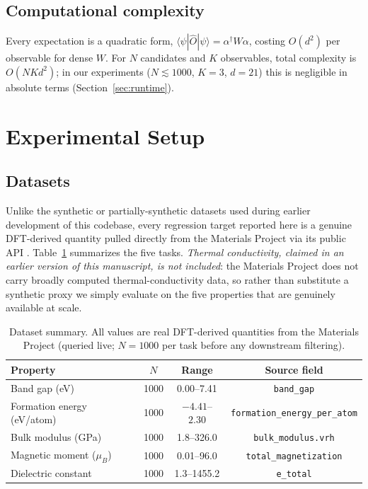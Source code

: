 \documentclass[conference]{IEEEtran}
\begin{document}
\subsection{Computational complexity}

Every expectation is a quadratic form, $\langle\psi|\hat{O}|\psi\rangle = \alpha^\dagger W \alpha$, costing $O(d^2)$ per observable for dense $W$. For $N$ candidates and $K$ observables, total complexity is $O(NKd^2)$; in our experiments ($N\lesssim 1000$, $K=3$, $d=21$) this is negligible in absolute terms (Section~\ref{sec:runtime}).

\section{Experimental Setup}\label{sec:setup}

\subsection{Datasets}

Unlike the synthetic or partially-synthetic datasets used during earlier development of this codebase, every regression target reported here is a genuine DFT-derived quantity pulled directly from the Materials Project via its public API \cite{jain2013materials}. Table~\ref{tab:dataset} summarizes the five tasks. \emph{Thermal conductivity, claimed in an earlier version of this manuscript, is not included}: the Materials Project does not carry broadly computed thermal-conductivity data, so rather than substitute a synthetic proxy we simply evaluate on the five properties that are genuinely available at scale.

\begin{table}[!t]
\centering
\caption{Dataset summary. All values are real DFT-derived quantities from the Materials Project (queried live; $N=1000$ per task before any downstream filtering).}
\label{tab:dataset}
\begin{tabular}{lccc}
\toprule
Property & $N$ & Range & Source field \\
\midrule
Band gap (eV) & 1000 & 0.00--7.41 & \texttt{band\_gap} \\
Formation energy (eV/atom) & 1000 & $-4.41$--$2.30$ & \texttt{formation\_energy\_per\_atom} \\
Bulk modulus (GPa) & 1000 & 1.8--326.0 & \texttt{bulk\_modulus.vrh} \\
Magnetic moment ($\mu_B$) & 1000 & 0.01--96.0 & \texttt{total\_magnetization} \\
Dielectric constant & 1000 & 1.3--1455.2 & \texttt{e\_total} \\
\bottomrule
\end{tabular}
\end{table}
\end{document}
